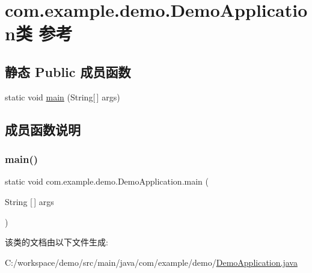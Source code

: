 \hypertarget{classcom_1_1example_1_1demo_1_1_demo_application}{}\section{com.\+example.\+demo.\+Demo\+Application类 参考}
\label{classcom_1_1example_1_1demo_1_1_demo_application}
\subsection*{静态 Public 成员函数}
\begin{DoxyCompactItemize}
\item 
static void \mbox{\hyperlink{classcom_1_1example_1_1demo_1_1_demo_application_a8a565fb84a5ce2745221d564733e61fd}{main}} (String\mbox{[}$\,$\mbox{]} args)
\end{DoxyCompactItemize}


\subsection{成员函数说明}
\mbox{\label{classcom_1_1example_1_1demo_1_1_demo_application_a8a565fb84a5ce2745221d564733e61fd}} 
\subsubsection{\texorpdfstring{main()}{main()}}
{\footnotesize\ttfamily static void com.\+example.\+demo.\+Demo\+Application.\+main (\begin{DoxyParamCaption}\item[{String \mbox{[}$\,$\mbox{]}}]{args }\end{DoxyParamCaption})\hspace{0.3cm}{\ttfamily [static]}}



该类的文档由以下文件生成\+:\begin{DoxyCompactItemize}
\item 
C\+:/workspace/demo/src/main/java/com/example/demo/\mbox{\hyperlink{_demo_application_8java}{Demo\+Application.\+java}}\end{DoxyCompactItemize}
